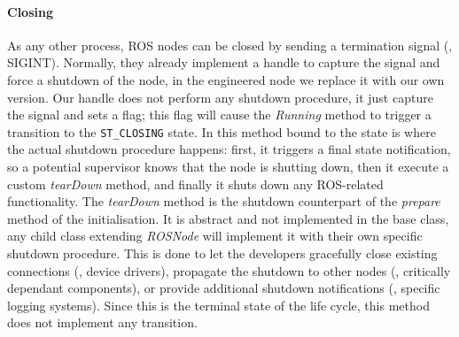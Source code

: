 \paragraph{Closing} As any other process, ROS nodes can be closed by sending a termination signal (\ie, SIGINT). Normally, they already implement a handle to capture the signal and force a shutdown of the node, in the engineered node we replace it with our own version. Our handle does not perform any shutdown procedure, it just capture the signal and sets a flag; this flag will cause the \textit{Running} method to trigger a transition to the \texttt{ST\_CLOSING} state.  In this method bound to the state is where the actual shutdown procedure happens: first, it triggers a final state notification, so a potential supervisor knows that the node is shutting down, then it execute a custom \textit{tearDown} method, and finally it shuts down any ROS-related functionality. The \textit{tearDown} method is the shutdown counterpart of the \textit{prepare} method of the initialisation. It is abstract and not implemented in the base class, any child class extending \textit{ROSNode} will implement it with their own specific shutdown procedure. This is done to let the developers gracefully close existing connections (\eg, device drivers), propagate the shutdown to other nodes (\eg, critically dependant components), or provide additional shutdown notifications (\eg, specific logging systems). Since this is the terminal state of the life cycle, this method does not implement any transition.

